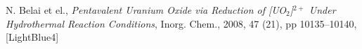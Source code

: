 \begin{frame}


  \begin{bottomnote}[0.5][19]
    N. Belai et el., \textit{Pentavalent Uranium Oxide via Reduction
    of [UO$_2$]$^{2+}$ Under Hydrothermal Reaction Conditions},
    Inorg. Chem., 2008, 47 (21), pp 10135--10140,
    [LightBlue4]
  \end{bottomnote}
\end{frame}


